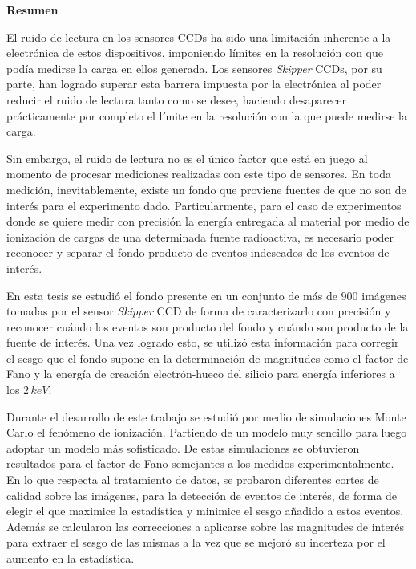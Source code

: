 \newpage
\begin{center}
    {\Large \textbf{Resumen}}
\end{center}
\noindent El ruido de lectura en los sensores CCDs ha sido una limitación inherente a la electrónica de estos dispositivos, imponiendo límites en la resolución con que podía medirse la carga en ellos generada. Los sensores \textit{Skipper} CCDs, por su parte, han logrado superar esta barrera impuesta por la electrónica al poder reducir el ruido de lectura tanto como se desee, haciendo desaparecer prácticamente por completo el límite en la resolución con la que puede medirse la carga.

Sin embargo, el ruido de lectura no es el único factor que está en juego al momento de procesar mediciones realizadas con este tipo de sensores. En toda medición, inevitablemente, existe un fondo que proviene fuentes de que no son de interés para el experimento dado. Particularmente, para el caso de experimentos donde se quiere medir con precisión la energía entregada al material por medio de ionización de cargas de una determinada fuente radioactiva, es necesario poder reconocer y separar el fondo producto de eventos indeseados de los eventos de interés.

En esta tesis se estudió el fondo presente en un conjunto de más de $900$ imágenes tomadas por el sensor \textit{Skipper} CCD de forma de caracterizarlo con precisión y reconocer cuándo los eventos son producto del fondo y cuándo son producto de la fuente de interés. Una vez logrado esto, se utilizó esta información para corregir el sesgo que el fondo supone en la determinación de magnitudes como el factor de Fano y la energía de creación electrón-hueco del silicio para energía inferiores a los $2\,\si{keV}$.

Durante el desarrollo de este trabajo se estudió por medio de simulaciones Monte Carlo el fenómeno de ionización. Partiendo de un modelo muy sencillo para luego adoptar un modelo más sofisticado. De estas simulaciones se obtuvieron resultados para el factor de Fano semejantes a los medidos experimentalmente. En lo que respecta al tratamiento de datos, se probaron diferentes cortes de calidad sobre las imágenes, para la detección de eventos de interés, de forma de elegir el que maximice la estadística y minimice el sesgo añadido a estos eventos. Además se calcularon las correcciones a aplicarse sobre las magnitudes de interés para extraer el sesgo de las mismas a la vez que se mejoró su incerteza por el aumento en la estadística.

